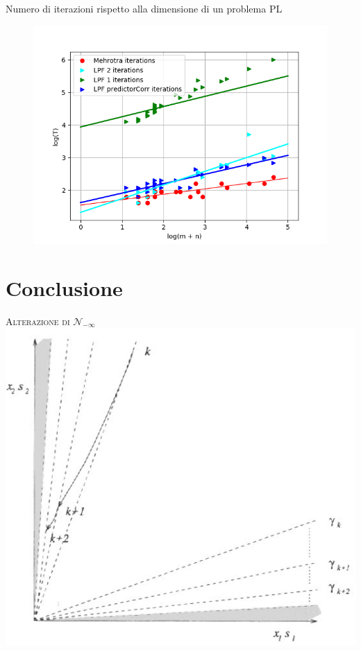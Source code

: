 \begin{frame}
	Numero di iterazioni rispetto alla dimensione di un problema PL
	\begin{figure}
		\includegraphics[width=0.7\paperwidth]{NUM.png}
	\end{figure}
\end{frame}


\section{Conclusione}

\begin{frame}{\textsc{\LARGE \textcolor{iris}{Alterazione di $\mathcal{N}_{-\infty}$}}}
	\includegraphics[scale = 0.45]{CONC.PNG}
\end{frame}

